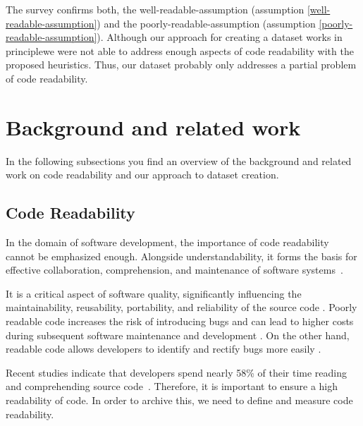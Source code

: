 \documentclass[%
class=scrreprt,
chapterprefix=false,%
open=right,%
twoside=false,%
paper=a4,%
logofile={Logo\_zentral\_farbig\_EN.png},%
thesistype=master,%
UKenglish,%
]{se2thesis}
\theoremstyle{definition}
\begin{document}
	The survey confirms both, the well-readable-assumption (assumption \ref{well-readable-assumption}) and the poorly-readable-assumption (assumption \ref{poorly-readable-assumption}). Although our approach for creating a dataset works in principlewe were not able to address enough aspects of code readability with the proposed heuristics. Thus, our dataset probably only addresses a partial problem of code readability.
		
\section{Background and related work} \label{Background and related work}
	In the following subsections you find an overview of the background and related work on code readability and our approach to dataset creation.
	
\subsection{Code Readability} \label{Readability}
		
	In the domain of software development, the importance of code readability cannot be emphasized enough. Alongside understandability, it forms the basis for effective collaboration, comprehension, and maintenance of software systems~\cite{posnett2011simpler, aggarwal2002integrated}.
	
	It is a critical aspect of software quality, significantly influencing the maintainability, reusability, portability, and reliability of the source code \cite{alawad2019empirical, sedano2016code}. Poorly readable code increases the risk of introducing bugs \cite{mannan2018towards, scalabrino2018comprehensive} and can lead to higher costs during subsequent software maintenance and development \cite{johnson2019empirical}. On the other hand, readable code allows developers to identify and rectify bugs more easily \cite{mi2023graph}.
	
	Recent studies indicate that developers spend nearly 58\% of their time reading and comprehending source code~\cite{buse2009learning, deimel1985uses, rugaber2000use, boehm2001defect, tashtoush2013impact, sedano2016code, xia2017measuring}.
	Therefore, it is important to ensure a high readability of code. In order to archive this, we need to define and measure code readability.
	
\end{document}
